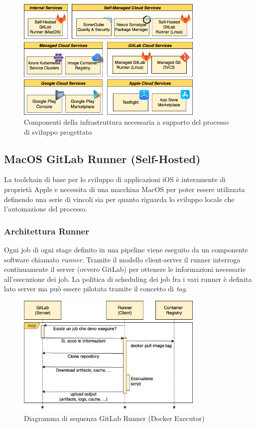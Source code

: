 \begin{figure}[H]
\centering
\includegraphics[width=0.8\textwidth]{img/tesi-3-infra.drawio.png}
\caption{Componenti della infrastruttura necessaria a supporto del processo di sviluppo progettato}
\end{figure}

\subsection{MacOS GitLab Runner (Self-Hosted)}
La toolchain di base per lo sviluppo di applicazioni iOS è interamente di proprietà Apple e necessita di una macchina MacOS per poter essere utilizzata definendo una serie di vincoli sia per quanto riguarda lo sviluppo locale che l'automazione del processo.
\subsubsection{Architettura Runner}
Ogni job di ogni stage definito in una pipeline viene eseguito da un componente software chiamato \textit{runner}. Tramite il modello client-server il runner interroga continuamente il server (ovvero GitLab) per ottenere le informazioni necessarie all'esecuzione dei job. La politica di scheduling dei job fra i vari runner è definita lato server ma può essere pilotata tramite il concetto di \textit{tag}.

\begin{figure}[H]
\centering
\includegraphics[width=0.8\textwidth]{img/tesi-17-runner.drawio.png}
\caption{Diagramma di sequenza GitLab Runner (Docker Executor)}
\end{figure}

